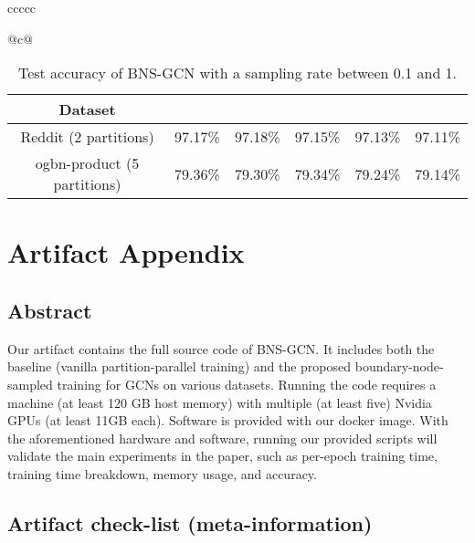 \documentclass{article}
\begin{document}
\begin{table*}[h]
\begin{tabular}{ccccc}
{\begin{tabular}[c]{@{}c@{}}
\begin{table}[h]
\centering
\caption{Test accuracy of BNS-GCN with a sampling rate  between 0.1 and 1.}
\label{tab:choice_of_p}
\begin{tabular}{c|ccccc}
\hline
Dataset &  &  &  &  &  \\
\hline
Reddit (2 partitions) & 97.17\% & 97.18\% & 97.15\% & 97.13\%  & 97.11\%\\
\hline
ogbn-product (5 partitions) & 79.36\% & 79.30\% & 79.34\% & 79.24\% & 79.14\%\\
\hline
\end{tabular}
\end{table}

\clearpage
\section{Artifact Appendix} 
\subsection{Abstract}
Our artifact contains the full source code of BNS-GCN. 
It includes both the baseline (vanilla partition-parallel training) and the proposed boundary-node-sampled training for GCNs on various datasets.
Running the code requires a machine (at least 120 GB host memory) with multiple (at least five) Nvidia GPUs (at least 11GB each).
Software is provided with our docker image.
With the aforementioned hardware and software, running our provided scripts will validate the main experiments in the paper, such as per-epoch training time, training time breakdown, memory usage, and accuracy.

\subsection{Artifact check-list (meta-information)}



\end{tabular}}
\end{tabular}
\end{table*}
\end{document}
